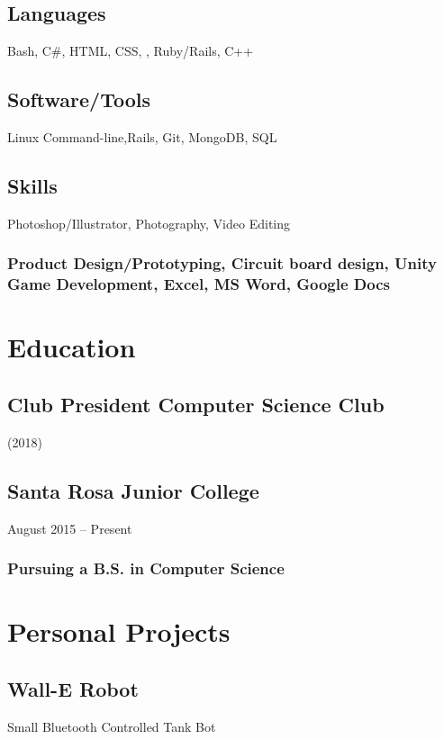 \documentclass{article}
\begin{document}
		\subsection{Languages}
		Bash,  C\#, HTML, CSS, , Ruby/Rails, C++
		\vspace{-2mm}
		
		\subsection{Software/Tools}
		Linux Command-line,Rails, Git, MongoDB, SQL
		\vspace{-3mm}
		\subsection{Skills}Photoshop/Illustrator, Photography, Video Editing
		\vspace{-3mm}
		\subsubsection{Product Design/Prototyping, Circuit board design,  Unity Game Development, Excel, MS Word, Google Docs}
		\vspace{-3mm}
    		
    		    		
	\section{Education}
        \subsection{Club President  Computer Science Club}  (2018)
        \vspace{-2mm}   
         
        \subsection{Santa Rosa Junior College} August 2015 – Present 
        \vspace{-2mm}
            \subsubsection{Pursuing a B.S. in Computer Science}
\section{Personal Projects}

	\subsection{Wall-E Robot}Small Bluetooth Controlled Tank Bot
    	\vspace{-3mm}
\end{document}

